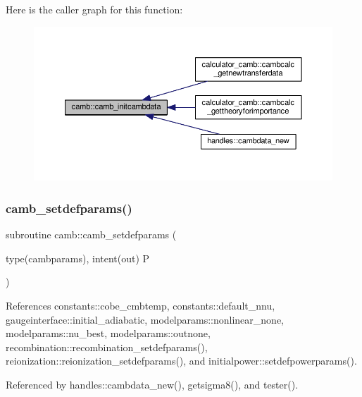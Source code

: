 Here is the caller graph for this function\+:
\nopagebreak
\begin{figure}[H]
\begin{center}
\leavevmode
\includegraphics[width=350pt]{namespacecamb_a64195b97e1e4c42b990076ff2bff6f1d_icgraph}
\end{center}
\end{figure}
\mbox{\label{namespacecamb_a6ce30ab6419006324d56d3e4434530f9}} 
\subsubsection{\texorpdfstring{camb\+\_\+setdefparams()}{camb\_setdefparams()}}
{\footnotesize\ttfamily subroutine camb\+::camb\+\_\+setdefparams (\begin{DoxyParamCaption}\item[{type(cambparams), intent(out)}]{P }\end{DoxyParamCaption})}



References constants\+::cobe\+\_\+cmbtemp, constants\+::default\+\_\+nnu, gaugeinterface\+::initial\+\_\+adiabatic, modelparams\+::nonlinear\+\_\+none, modelparams\+::nu\+\_\+best, modelparams\+::outnone, recombination\+::recombination\+\_\+setdefparams(), reionization\+::reionization\+\_\+setdefparams(), and initialpower\+::setdefpowerparams().



Referenced by handles\+::cambdata\+\_\+new(), getsigma8(), and tester().

